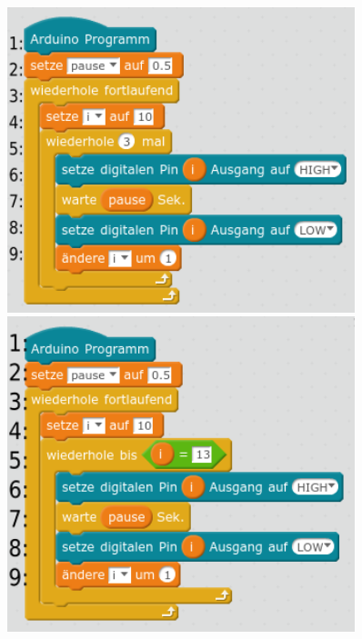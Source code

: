 \documentclass[ngerman, 11pt]{scrreprt}
\begin{document}
	\begin{figure}[H]
		\begin{minipage}{0.48\textwidth}
			\centering
			\includegraphics[width=0.9\textwidth]{../lsg/4-2-A1-Lauflicht-Lsg1-z.png}
		\end{minipage}
		\hfill
		\begin{minipage}{0.48\textwidth}
			\centering
			\includegraphics[width=0.9\textwidth]{../lsg/4-2-A1-Lauflicht-Lsg2-z.png}
		\end{minipage}
	\end{figure}

	\newpage
	\setcounter{chapter}{4}
	\setcounter{page}{21}
\end{document}
